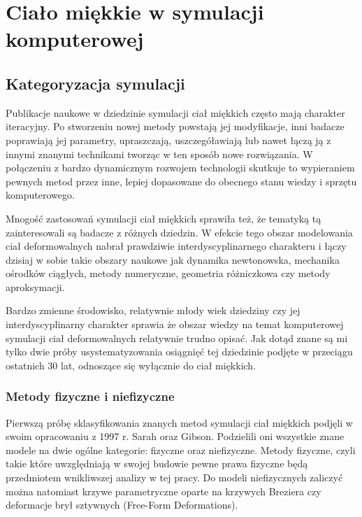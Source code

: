 \chapter{Ciało miękkie w symulacji komputerowej}

\section{Kategoryzacja symulacji}

Publikacje naukowe w dziedzinie symulacji ciał miękkich często mają charakter
iteracyjny. Po stworzeniu nowej metody powstają jej modyfikacje, inni badacze
poprawiają jej parametry, upraszczają,
uszczegóławiają lub nawet łączą ją z innymi znanymi technikami tworząc w ten
sposób nowe rozwiązania. W połączeniu z bardzo dynamicznym rozwojem technologii 
skutkuje to wypieraniem pewnych metod przez inne, lepiej dopasowane do obecnego
stanu wiedzy i sprzętu komputerowego.

Mnogość zastosowań symulacji ciał miękkich sprawiła też, że tematyką tą
zainteresowali są badacze z różnych dziedzin. W efekcie tego obszar modelowania ciał
deformowalnych nabrał prawdziwie interdyscyplinarnego charakteru i łączy dzisiaj w sobie
takie obszary naukowe jak dynamika newtonowska, mechanika ośrodków ciągłych,
metody numeryczne, geometria różniczkowa czy metody aproksymacji\cite{pbdo}.

Bardzo zmienne środowisko, relatywnie młody wiek dziedziny czy jej 
interdyscyplinarny charakter sprawia
że obszar wiedzy na temat komputerowej symulacji ciał deformowalnych relatywnie
trudno opisać.
Jak dotąd znane są mi tylko dwie próby usystematyzowania osiągnięć
tej dziedzinie podjęte w przeciągu ostatnich 30 lat, odnoszące się wyłącznie do
ciał miękkich.

\subsection{Metody fizyczne i niefizyczne}

Pierwszą próbę sklasyfikowania znanych metod symulacji ciał miękkich
podjęli w swoim opracowaniu z 1997 r. Sarah oraz Gibson\cite{TR97-19}. Podzielili
oni wszystkie znane modele na dwie ogólne kategorie: fizyczne oraz niefizyczne. Metody fizyczne, czyli
takie które uwzględniają w swojej budowie pewne prawa fizyczne będą przedmiotem
wnikliwszej analizy w tej pracy. Do modeli niefizycznych zaliczyć można natomiast
krzywe parametryczne oparte na krzywych Breziera czy deformacje brył sztywnych (Free-Form Deformations).\cite{pbdo}

